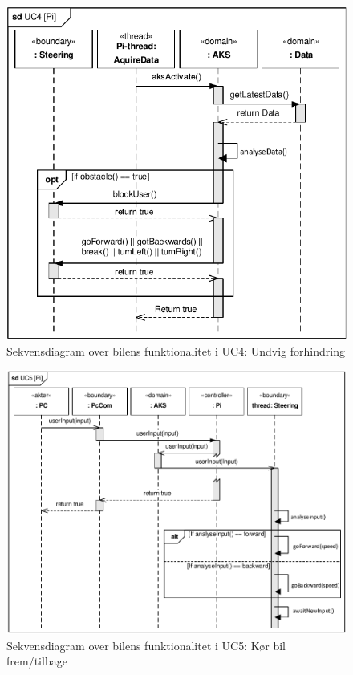 \begin{figure}[h]
\centering
\includegraphics[]{../fig/diagrammer/bil/sd_uc4.pdf}
\caption{Sekvensdiagram over  bilens funktionalitet i UC4: Undvig forhindring}
\label{fig:sd_uc4_bil}
\end{figure}

\begin{figure}[h]
\centering
\includegraphics[]{../fig/diagrammer/bil/sd_uc5.pdf}
\caption{Sekvensdiagram over  bilens funktionalitet i UC5: Kør bil frem/tilbage}
\label{fig:sd_uc5_bil}
\end{figure}

